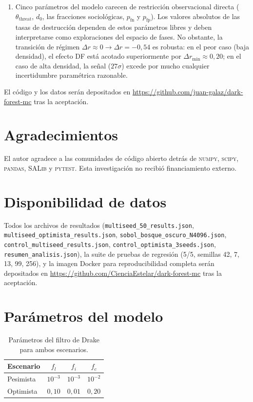 \documentclass[11pt,a4paper,onecolumn]{article}
\begin{document}
\begin{enumerate}
  \item Cinco parámetros del modelo carecen de restricción observacional
        directa ($\theta_\text{threat}$, $d_0$, las fracciones
        sociológicas, $p_\text{fn}$ y $p_\text{fp}$).
        Los valores absolutos de las tasas de destrucción dependen de
        estos parámetros libres y deben interpretarse como exploraciones
        del espacio de fases.
        No obstante, la transición de régimen $\Delta r \approx 0 \to
        \Delta r = -0{,}54$ es robusta: en el peor caso (baja densidad),
        el efecto DF está acotado superiormente por
        $\Delta r_\text{min} \approx 0{,}20$; en el caso de alta
        densidad, la señal ($27\sigma$) excede por mucho cualquier
        incertidumbre paramétrica razonable.
\end{enumerate}

El código y los datos serán depositados en
\url{https://github.com/juan-galaz/dark-forest-mc}
tras la aceptación.

\section*{Agradecimientos}

El autor agradece a las comunidades de código abierto detrás de
\textsc{numpy}, \textsc{scipy}, \textsc{pandas}, \textsc{SALib}
y \textsc{pytest}.
Esta investigación no recibió financiamiento externo.

\section*{Disponibilidad de datos}

Todos los archivos de resultados
(\texttt{multiseed\_50\_results.json},
\texttt{multiseed\_optimista\_results.json},
\texttt{sobol\_bosque\_oscuro\_N4096.json},
\texttt{control\_multiseed\_results.json},
\texttt{control\_optimista\_3seeds.json},
\texttt{resumen\_analisis.json}), la suite de pruebas de regresión
(5/5, semillas 42, 7, 13, 99, 256), y la imagen Docker para
reproducibilidad completa serán depositados en
\url{https://github.com/CienciaEstelar/dark-forest-mc}
tras la aceptación.

\appendix
\section{Parámetros del modelo}
\label{app:params}

\begin{table}
  \centering
  \caption{Parámetros del filtro de Drake para ambos escenarios.}
  \label{tab:scenarios}
  \begin{tabular}{lccc}
    \toprule
    Escenario & $f_l$ & $f_i$ & $f_c$ \\
    \midrule
    Pesimista & $10^{-3}$ & $10^{-3}$ & $10^{-2}$ \\
    Optimista  & $0{,}10$    & $0{,}01$    & $0{,}20$    \\
    \bottomrule
  \end{tabular}
\end{table}
\end{document}
